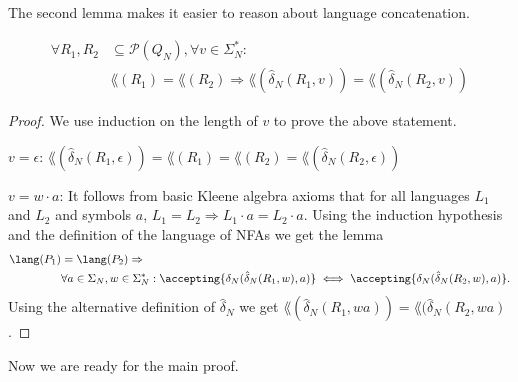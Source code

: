 The second lemma makes it easier to reason about language concatenation.

\begin{lemma}
  \begin{align*}
    \forall R_1, R_2 &\subseteq \mathcal{P}(Q_N), \forall v \in \Sigma_N^*:\\
      &\lang(R_1) = \lang(R_2) \Rightarrow
        \lang(\hat{\delta}_N(R_1, v)) = \lang(\hat{\delta}_N(R_2, v))
  \end{align*}
\end{lemma}

\begin{proof}
  We use induction on the length of $v$ to prove the above statement.

  $v = \epsilon$:
    $\lang(\hat{\delta}_N(R_1, \epsilon))
      = \lang(R_1)
      = \lang(R_2)
      = \lang(\hat{\delta}_N(R_2, \epsilon))$

  $v = w \cdot a$:
    It follows from basic Kleene algebra axioms that
      for all languages $L_1$ and $L_2$ and symbols $a$,
      $L_1 = L_2 \Rightarrow L_1 \cdot a = L_2 \cdot a$.
    Using the induction hypothesis and the definition of the language of NFAs
      we get the lemma
    \begin{align*}\lang(P_1) &= \lang(P_2) \Rightarrow\\
      &\forall a \in \Sigma_N, w \in \Sigma_N^\ast:
        \accepting{\delta_N(\hat{\delta}_N(R_1, w), a)}
          \iff \accepting{\delta_N(\hat{\delta}_N(R_2, w), a)}.
    \end{align*}
    Using the alternative definition of $\hat{\delta}_N$ we get
      $\lang(\hat{\delta}_N(R_1, wa)) = \lang(\hat{\delta}_N(R_2, wa)$.
\end{proof}

Now we are ready for the main proof.

